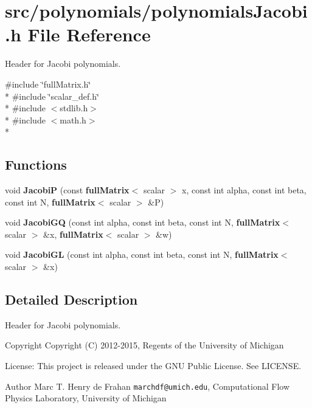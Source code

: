 \section{src/polynomials/polynomials\-Jacobi.h File Reference}
\label{polynomialsJacobi_8h}


Header for Jacobi polynomials.  


{\ttfamily \#include \char`\"{}full\-Matrix.\-h\char`\"{}}\\*
{\ttfamily \#include \char`\"{}scalar\-\_\-def.\-h\char`\"{}}\\*
{\ttfamily \#include $<$stdlib.\-h$>$}\\*
{\ttfamily \#include $<$math.\-h$>$}\\*
\subsection*{Functions}
\begin{DoxyCompactItemize}
\item 
void {\bf Jacobi\-P} (const {\bf full\-Matrix}$<$ scalar $>$ x, const int alpha, const int beta, const int N, {\bf full\-Matrix}$<$ scalar $>$ \&P)
\item 
void {\bf Jacobi\-G\-Q} (const int alpha, const int beta, const int N, {\bf full\-Matrix}$<$ scalar $>$ \&x, {\bf full\-Matrix}$<$ scalar $>$ \&w)
\item 
void {\bf Jacobi\-G\-L} (const int alpha, const int beta, const int N, {\bf full\-Matrix}$<$ scalar $>$ \&x)
\end{DoxyCompactItemize}


\subsection{Detailed Description}
Header for Jacobi polynomials. \begin{DoxyCopyright}{Copyright}
Copyright (C) 2012-\/2015, Regents of the University of Michigan 
\end{DoxyCopyright}
\begin{DoxyParagraph}{License\-:}
This project is released under the G\-N\-U Public License. See L\-I\-C\-E\-N\-S\-E. 
\end{DoxyParagraph}
\begin{DoxyAuthor}{Author}
Marc T. Henry de Frahan {\tt marchdf@umich.\-edu}, Computational Flow Physics Laboratory, University of Michigan 
\end{DoxyAuthor}


